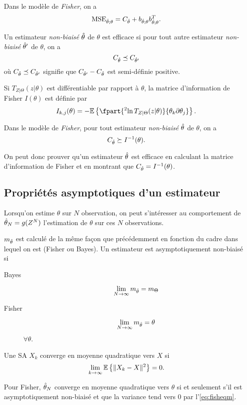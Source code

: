 Dans le modèle de \emph{Fisher}, on a
\begin{equation}
  \label{eq:fisheqm}
  \mathrm{MSE}_{\hat{\theta};\theta} = C_{\hat{\theta}} + b_{\hat{\theta};\theta}b_{\hat{\theta};\theta}^T.
\end{equation}

\begin{mydef}
  Un estimateur \emph{non-biaisé} $\hat{\theta}$ de $\theta$ est efficace si
  pour tout autre estimateur \emph{non-biaisé} $\hat{\theta}'$ de $\theta$, on a
  \[ C_{\hat{\theta}} \preceq C_{\hat{\theta}'} \]
  où $C_{\hat{\theta}} \preceq C_{\hat{\theta}'}$ signifie que $C_{\hat{\theta}'} - C_{\hat{\theta}}$
  est semi-définie positive.
\end{mydef}

\begin{mydef}
  Si $T_{Z|\Theta}(z|\theta)$ est différentiable par rapport à $\theta$,
  la matrice d'information de Fisher $I(\theta)$ est définie par
  \[ I_{k,j}(\theta) = -\Ex{\fpart{^2\ln T_{Z|\Theta}(z|\theta)}{\theta_k\partial\theta_j}}. \]
\end{mydef}

\begin{myineg}
  Dans le modèle de \emph{Fisher},
  pour tout estimateur \emph{non-biaisé} $\hat{\theta}$ de $\theta$,
  on a
  \[ C_{\hat{\theta}} \succeq I^{-1}(\theta). \]
\end{myineg}

On peut donc prouver qu'un estimateur $\hat{\theta}$ est efficace en calculant
la matrice d'information de Fisher
et en montrant que $C_{\hat{\theta}} = I^{-1}(\theta)$.

\subsection{Propriétés asymptotiques d'un estimateur}
Lorsqu'on estime $\theta$ sur $N$ observation,
on peut s'intéresser au comportement de $\hat{\theta}_N = g(Z^N)$ l'estimation
de $\theta$ sur ces $N$ observations.
\begin{mydef}
  $m_{\hat{\theta}}$ est calculé de la même façon que précédemment
  en fonction du cadre dans lequel on est (Fisher ou Bayes).
  Un estimateur est asymptotiquement non-biaisé si
  \begin{description}
    \item[Bayes]
      \[ \lim_{N\to\infty} m_{\hat{\theta}} = m_\Theta \]
    \item[Fisher]
      \[ \lim_{N\to\infty} m_{\hat{\theta}} = \theta \]
      $\forall \theta$.
  \end{description}
\end{mydef}
\begin{mydef}
  Une SA $X_k$ converge en moyenne quadratique vers $X$ si
  \[ \lim_{k\to\infty} \mathbb{E}\left\{\|X_k-X\|^2\right\} = 0. \]
\end{mydef}
Pour Fisher,
$\hat{\theta}_N$ converge en moyenne quadratique vers $\theta$ si
et seulement s'il est asymptotiquement non-biaisé et que la variance tend
vers 0 par l'\eqref{eq:fisheqm}.

